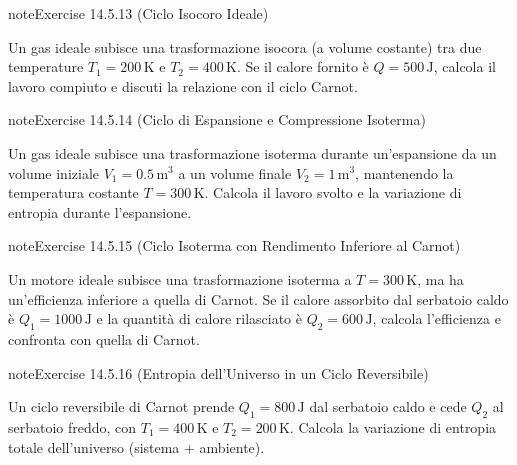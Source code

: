 \documentclass[letterpaper,10pt,italian]{jupyterBook}
\begin{document}
\begin{sphinxadmonition}{note}{Exercise 14.5.13 (Ciclo Isocoro Ideale)}



\sphinxAtStartPar
Un gas ideale subisce una trasformazione isocora (a volume costante) tra due temperature \(T_1 = 200 \, \text{K}\) e \(T_2 = 400 \, \text{K}\). Se il calore fornito è \(Q = 500 \, \text{J}\), calcola il lavoro compiuto e discuti la relazione con il ciclo Carnot.
\end{sphinxadmonition}
 \label{exercise:ch/thermodynamics/heat-engine-problems-exercise-13}

\begin{sphinxadmonition}{note}{Exercise 14.5.14 (Ciclo di Espansione e Compressione Isoterma)}



\sphinxAtStartPar
Un gas ideale subisce una trasformazione isoterma durante un’espansione da un volume iniziale \(V_1 = 0.5 \, \text{m}^3\) a un volume finale \(V_2 = 1 \, \text{m}^3\), mantenendo la temperatura costante \(T = 300 \, \text{K}\). Calcola il lavoro svolto e la variazione di entropia durante l’espansione.
\end{sphinxadmonition}
 \label{exercise:ch/thermodynamics/heat-engine-problems-exercise-14}

\begin{sphinxadmonition}{note}{Exercise 14.5.15 (Ciclo Isoterma con Rendimento Inferiore al Carnot)}



\sphinxAtStartPar
Un motore ideale subisce una trasformazione isoterma a \(T = 300 \, \text{K}\), ma ha un’efficienza inferiore a quella di Carnot. Se il calore assorbito dal serbatoio caldo è \(Q_1 = 1000 \, \text{J}\) e la quantità di calore rilasciato è \(Q_2 = 600 \, \text{J}\), calcola l’efficienza e confronta con quella di Carnot.
\end{sphinxadmonition}
 \label{exercise:ch/thermodynamics/heat-engine-problems-exercise-15}

\begin{sphinxadmonition}{note}{Exercise 14.5.16 (Entropia dell’Universo in un Ciclo Reversibile)}



\sphinxAtStartPar
Un ciclo reversibile di Carnot prende \(Q_1 = 800 \, \text{J}\) dal serbatoio caldo e cede \(Q_2\) al serbatoio freddo, con \(T_1 = 400 \, \text{K}\) e \(T_2 = 200 \, \text{K}\). Calcola la variazione di entropia totale dell’universo (sistema + ambiente).
\end{sphinxadmonition}
 \label{exercise:ch/thermodynamics/heat-engine-problems-exercise-16}
\end{document}
